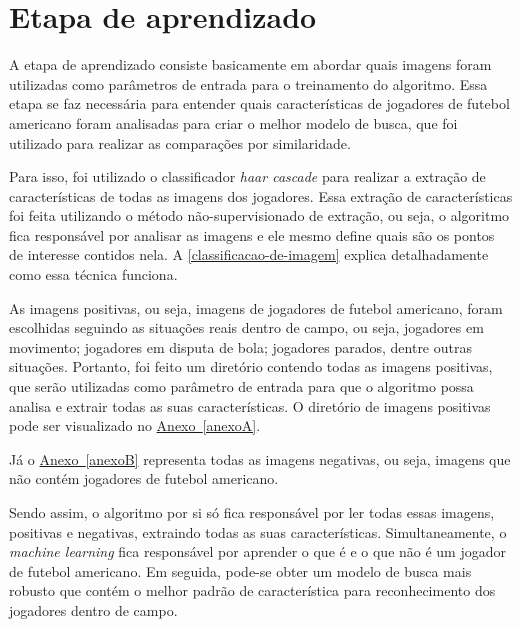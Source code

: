 \section{\textbf{Etapa de aprendizado}}
\label{explicacao-aprendizado}

\newcommand{\refanexo}[1]{\hyperref[#1]{Anexo~\ref{#1}}}

A etapa de aprendizado consiste basicamente em abordar quais imagens foram utilizadas como parâmetros de entrada para o treinamento do algoritmo. Essa etapa se faz necessária para entender quais características de jogadores de futebol americano foram analisadas para criar o melhor modelo de busca, que foi utilizado para realizar as comparações por similaridade.

Para isso, foi utilizado o classificador \textit{haar cascade} para realizar a extração de características de todas as imagens dos jogadores. Essa extração de características foi feita utilizando o método não-supervisionado de extração, ou seja, o algoritmo fica responsável por analisar as imagens e ele mesmo define quais são os pontos de interesse contidos nela. A \autoref{classificacao-de-imagem} explica detalhadamente como essa técnica funciona.

As imagens positivas, ou seja, imagens de jogadores de futebol americano, foram escolhidas seguindo as situações reais dentro de campo, ou seja, jogadores em movimento; jogadores em disputa de bola; jogadores parados, dentre outras situações. Portanto, foi feito um diretório contendo todas as imagens positivas, que serão utilizadas como parâmetro de entrada para que o algoritmo possa analisa e extrair todas as suas características. O diretório de imagens positivas pode ser visualizado no \refanexo{anexoA}.

Já o \refanexo{anexoB} representa todas as imagens negativas, ou seja, imagens que não contém jogadores de futebol americano.

Sendo assim, o algoritmo por si só fica responsável por ler todas essas imagens, positivas e negativas, extraindo todas as suas características. Simultaneamente, o \textit{machine learning} fica responsável por aprender o que é e o que não é um jogador de futebol americano. Em seguida, pode-se obter um modelo de busca mais robusto que contém o melhor padrão de característica para reconhecimento dos jogadores dentro de campo.